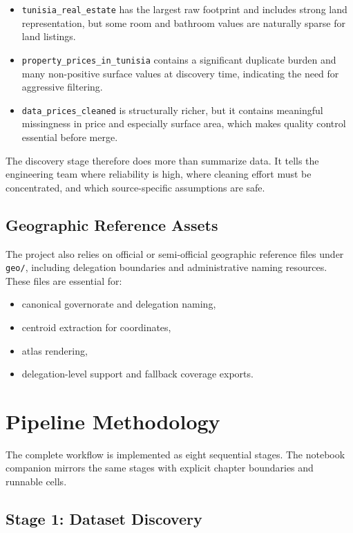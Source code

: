 \documentclass[11pt,a4paper]{article}
\newcommand{\code}[1]{\texttt{#1}}
\begin{document}
\begin{itemize}
\item \code{tunisia\_real\_estate} has the largest raw footprint and includes strong land representation, but some room and bathroom values are naturally sparse for land listings.
\item \code{property\_prices\_in\_tunisia} contains a significant duplicate burden and many non-positive surface values at discovery time, indicating the need for aggressive filtering.
\item \code{data\_prices\_cleaned} is structurally richer, but it contains meaningful missingness in price and especially surface area, which makes quality control essential before merge.
\end{itemize}

The discovery stage therefore does more than summarize data. It tells the engineering team where reliability is high, where cleaning effort must be concentrated, and which source-specific assumptions are safe.

\subsection{Geographic Reference Assets}

The project also relies on official or semi-official geographic reference files under \code{geo/}, including delegation boundaries and administrative naming resources. These files are essential for:

\begin{itemize}
\item canonical governorate and delegation naming,
\item centroid extraction for coordinates,
\item atlas rendering,
\item delegation-level support and fallback coverage exports.
\end{itemize}

\section{Pipeline Methodology}

The complete workflow is implemented as eight sequential stages. The notebook companion mirrors the same stages with explicit chapter boundaries and runnable cells.

\subsection{Stage 1: Dataset Discovery}
\end{document}
